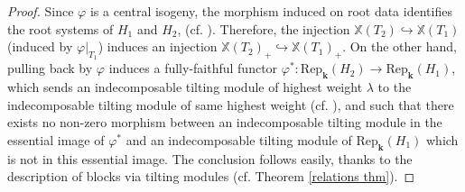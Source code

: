 \documentclass[11pt]{amsart}
\theoremstyle{plain}
\theoremstyle{remark}
\numberwithin{equation}{section}
\begin{document}
	\begin{proof}
		Since $\varphi$ is a central isogeny, the morphism induced on root data identifies the root systems of $H_1$ and $H_2$, (cf. \cite[§II.1.17]{jantzen2003representations}). Therefore, the injection $\mathbb{X}(T_2)\hookrightarrow\mathbb{X}(T_1)$ (induced by $\varphi|_{T_1}$) induces an injection $\mathbb{X}(T_2)_+\hookrightarrow\mathbb{X}(T_1)_+$. On the other hand, pulling back by $\varphi$ induces a fully-faithful functor $\varphi^*:\mathrm{Rep}_\mathbf{k}(H_2)\to\mathrm{Rep}_\mathbf{k}(H_1)$, which sends an indecomposable tilting module of highest weight $\lambda$ to the indecomposable tilting module of same highest weight (cf. \cite[§E.7]{jantzen2003representations}), and such that there exists no non-zero morphism between an indecomposable tilting module in the essential image of $\varphi^*$ and an indecomposable tilting module of $\mathrm{Rep}_\mathbf{k}(H_1)$ which is not in this essential image. The conclusion follows easily, thanks to the description of blocks via tilting modules (cf. Theorem \ref{relations thm}).
	\end{proof}
\end{document}
